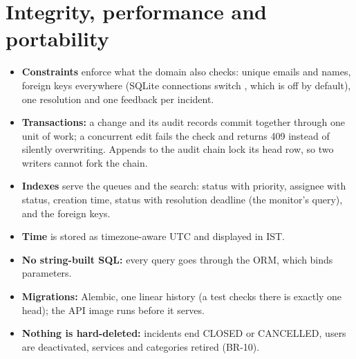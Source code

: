 \section{Integrity, performance and portability}
\begin{itemize}
  \item \textbf{Constraints} enforce what the domain also checks: unique emails and names,
    foreign keys everywhere (SQLite connections switch , which is off by
    default), one resolution and one feedback per incident.
  \item \textbf{Transactions:} a change and its audit records commit together through one unit
    of work; a concurrent edit fails the  check and returns 409 instead of
    silently overwriting. Appends to the audit chain lock its head row, so two writers cannot
    fork the chain.
  \item \textbf{Indexes} serve the queues and the search: status with priority, assignee with
    status, creation time, status with resolution deadline (the monitor's query), and the
    foreign keys.
  \item \textbf{Time} is stored as timezone-aware UTC and displayed in IST.
  \item \textbf{No string-built SQL:} every query goes through the ORM, which binds parameters.
  \item \textbf{Migrations:} Alembic, one linear history (a test checks there is exactly one
    head); the API image runs  before it serves.
  \item \textbf{Nothing is hard-deleted:} incidents end CLOSED or CANCELLED, users are
    deactivated, services and categories retired (BR-10).
\end{itemize}

